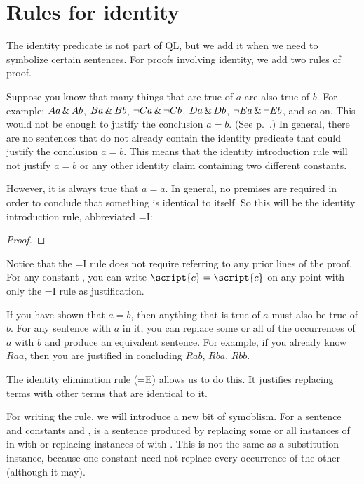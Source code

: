 \section{Rules for identity}
The identity predicate is not part of QL, but we add it when we need to symbolize certain sentences. For proofs involving identity, we add two rules of proof.

Suppose you know that many things that are true of $a$ are also true of $b$. For example: $Aa\,\&\, Ab$, $Ba\,\&\, Bb$, $\neg Ca\,\&\,\neg Cb$, $Da\,\&\, Db$, $\neg Ea\,\&\,\neg Eb$, and so on. This would not be enough to justify the conclusion $a=b$. (See p.~\pageref{model.nonidentity}.) In general, there are no sentences that do not already contain the identity predicate that could justify the conclusion $a=b$. This means that the identity introduction rule will not justify $a=b$ or any other identity claim containing two different constants.

However, it is always true that $a=a$. In general, no premises are required in order to conclude that something is identical to itself. So this will be the identity introduction rule, abbreviated {=}I:

\begin{proof}
	 
\end{proof}

Notice that the {=}I rule does not require referring to any prior lines of the proof. For any constant , you can write $\script{c}=\script{c}$ on any point with only the {=}I rule as justification.

If you have shown that $a=b$, then anything that is true of $a$ must also be true of $b$. For any sentence with $a$ in it, you can replace some or all of the occurrences of $a$ with $b$ and produce an equivalent sentence. For example, if you already know $Raa$, then you are justified in concluding $Rab$, $Rba$, $Rbb$.


The identity elimination rule ({=}E) allows us to do this. It justifies replacing terms with other terms that are identical to it.

For writing the rule, we will introduce a new bit of symoblism. For a sentence  and constants  and ,  is a sentence produced by replacing some or all instances of  in  with  or replacing instances of  with . This is not the same as a substitution instance, because one constant need not replace every occurrence of the other (although it may).


